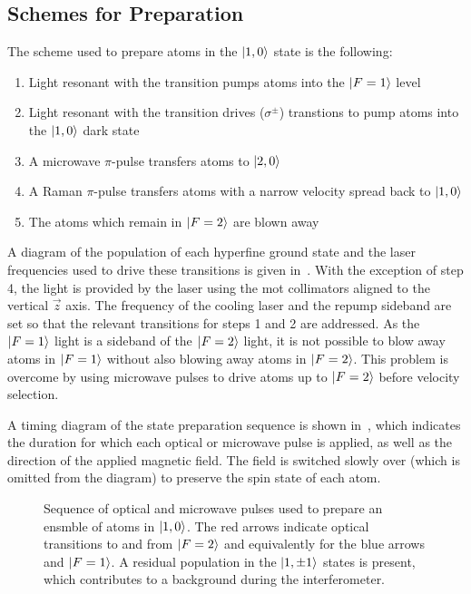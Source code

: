 \subsection{Schemes for Preparation}\label{subsec:prep_schemes}
The scheme used to prepare atoms in the \(\ket{1,0}\) state is the following:
\begin{enumerate}
    \item Light resonant with the  transition pumps atoms into the \(\ket{F=1}\) level
    \item Light resonant with the  transition drives (\(\sigma^{\pm}\)) transtions to pump atoms into the \(\ket{1,0}\) dark state
    \item A microwave $\pi$-pulse transfers atoms to \(\ket{2,0}\)
    \item A Raman $\pi$-pulse transfers atoms with a narrow velocity spread back to \(\ket{1,0}\)
    \item The atoms which remain in \(\ket{F=2}\) are blown away
\end{enumerate}
A diagram of the population of each hyperfine ground state and the laser frequencies used to drive these transitions is given in~. With the exception of step 4, the light is provided by the \Muquans laser using the \ac{mot} collimators aligned to the vertical \(\vec{z}\) axis. The frequency of the cooling laser and the repump sideband are set so that the relevant transitions for steps 1 and 2 are addressed. As the \(\ket{F=1}\) light is a sideband of the \(\ket{F=2}\) light, it is not possible to blow away atoms in \(\ket{F=1}\) without also blowing away atoms in \(\ket{F=2}\). This problem is overcome by using microwave pulses to drive atoms up to \(\ket{F=2}\) before velocity selection.
\par\noindent
A timing diagram of the state preparation sequence is shown in~, which indicates the duration for which each optical or microwave pulse is applied, as well as the direction of the applied magnetic field. The field is switched slowly over  (which is omitted from the diagram) to preserve the spin state of each atom. 
\begin{figure}
    \centering
    \fontsize{16pt}{16pt}
    \resizebox{0.8\textwidth}{!}{}
    \caption[State preparation pulse sequence]{Sequence of optical and microwave pulses used to prepare an ensmble of atoms in \(\ket{1,0}\). The red arrows indicate optical transitions to and from \(\ket{F=2}\) and equivalently for the blue arrows and \(\ket{F=1}\). A residual population in the \(\ket{1,\pm 1}\) states is present, which contributes to a background during the interferometer.}
    \label{fig:state_prep}
\end{figure}
